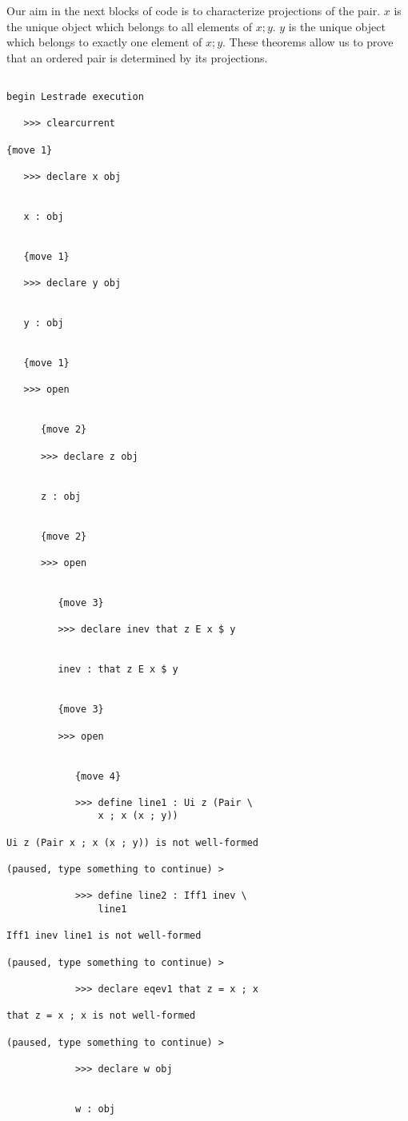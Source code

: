 \documentclass[12pt]{article}
\begin{document}
Our aim in the next blocks of code is to characterize projections of the pair.  $x$ is the unique object which belongs to all elements of $x;y$.  $y$ is the unique object which belongs to exactly one element of $x;y$.  These theorems allow us to prove that an ordered pair is determined by its projections.

\begin{verbatim}

begin Lestrade execution

   >>> clearcurrent

{move 1}

   >>> declare x obj


   x : obj


   {move 1}

   >>> declare y obj


   y : obj


   {move 1}

   >>> open


      {move 2}

      >>> declare z obj


      z : obj


      {move 2}

      >>> open


         {move 3}

         >>> declare inev that z E x $ y


         inev : that z E x $ y


         {move 3}

         >>> open


            {move 4}

            >>> define line1 : Ui z (Pair \
                x ; x (x ; y))

Ui z (Pair x ; x (x ; y)) is not well-formed

(paused, type something to continue) >

            >>> define line2 : Iff1 inev \
                line1

Iff1 inev line1 is not well-formed

(paused, type something to continue) >

            >>> declare eqev1 that z = x ; x

that z = x ; x is not well-formed

(paused, type something to continue) >

            >>> declare w obj


            w : obj



\end{verbatim}
\end{document}
